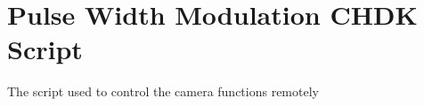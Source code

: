 \section{Pulse Width Modulation CHDK Script}
\label{app:pwm}

The script used to control the camera functions remotely
